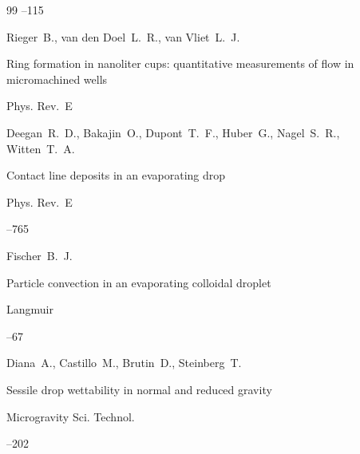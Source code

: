 \begin{thebibliography}{99}
--115




\by Rieger~B., van den Doel~L.~R., van Vliet~L.~J.

\paper Ring formation in nanoliter cups: quantitative measurements of flow in micromachined wells 

\jour Phys. Rev.~E









\by Deegan~R.~D., Bakajin~O., Dupont~T.~F., Huber~G., Nagel~S.~R., Witten~T.~A.

\paper  Contact line deposits in an evaporating drop

\jour Phys. Rev.~E




--765





\by Fischer~B.~J.

\paper  Particle convection in an evaporating colloidal droplet 

\jour Langmuir




--67





\by Diana~A., Castillo~M., Brutin~D., Steinberg~T.

\paper  Sessile drop wettability in normal and reduced gravity 

\jour Microgravity Sci. Technol.




--202


\end{thebibliography}
